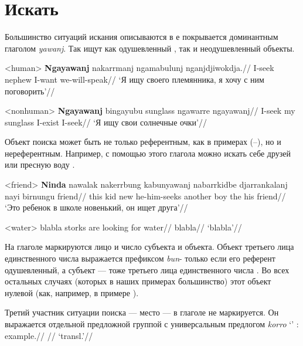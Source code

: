 
\section{Искать}
Большинство ситуаций искания описываются в  е покрывается доминантным глаголом \textit{yawanj}. Так ищут как одушевленный , так и неодушевленный  объекты. %

\ex<human> \begingl
\gla \textbf{Ngayawanj} nakarrmanj ngamabulunj nganjdjiwokdja.//
\glb I-seek nephew I-want we-will-speak//
\glft `Я ищу своего племянника, я хочу с ним поговорить'//
\endgl \xe

\ex<nonhuman> \begingl
\gla \textbf{Ngayawanj} bingayubu sunglass ngawarre ngayawanj//
\glb I-seek my sunglass I-exist I-seek//
\glft `Я ищу свои солнечные очки'//
\endgl \xe

Объект поиска может быть не только референтным, как в примерах (--), но и нереферентным. Например, с помощью этого глагола можно искать себе друзей  или пресную воду .

\ex<friend> \begingl
\gla \textbf{Ninda} nawalak nakerrbung kabunyawanj nabarrkidbe djarrankalanj nayi birnungu friend//
\glb this kid new he-him-seeks another boy the his friend//
\glft `Это ребенок в школе новенький, он ищет друга'//
\endgl \xe

\ex<water>\begingl
\gla blabla storks are looking for water//
\glb blabla//
\glft `blabla'//
\endgl \xe

На глаголе маркируются лицо и число субъекта и объекта. Объект третьего лица единственного числа выражается префиксом \textit{bun}- только если его референт одушевленный, а субъект --- тоже третьего лица единственного числа . Во всех остальных случаях (которых в наших примерах большинство) этот объект нулевой (как, например, в примере ). 

Третий участник ситуации поиска --- место --- в глаголе не маркируется. Он выражается отдельной предложной группой с универсальным предлогом \textit{korro} `\korro' :
\begingl
\gla example.//
\glb //
\glft `transl.'\trailingcitation{[src]}//
\endgl\xe





